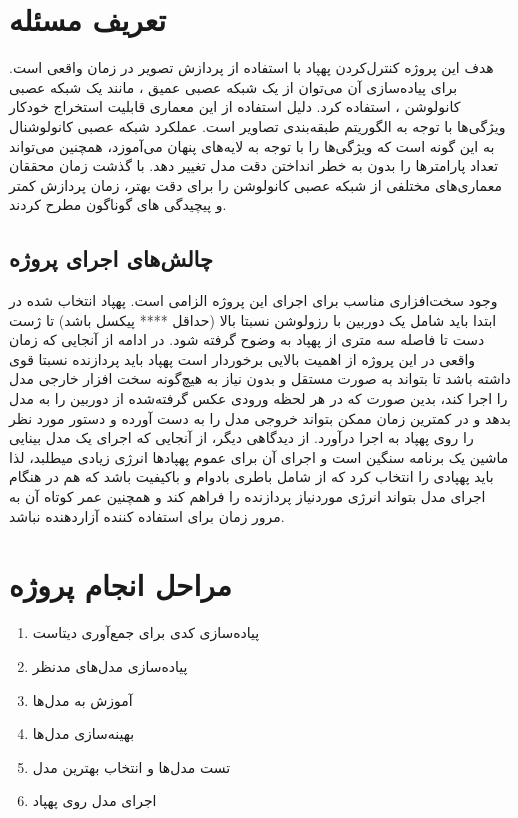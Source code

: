 \section{تعریف مسئله}
هدف این پروژه کنترل‌کردن پهپاد با استفاده از پردازش تصویر در زمان واقعی است. برای پیاده‌سازی آن می‌توان از یک شبکه عصبی عمیق 
، مانند یک شبکه عصبی کانولوشن  ، استفاده کرد. دلیل استفاده از این معماری قابلیت استخراج خودکار ویژگی‌ها با توجه به الگوریتم طبقه‌بندی تصاویر
است. عملکرد شبکه عصبی کانولوشنال به این گونه است که ویژگی‌ها را با توجه به لایه‌های پنهان می‌آموزد، همچنین می‌تواند تعداد پارامترها را بدون به خطر انداختن دقت مدل تغییر دهد. با گذشت زمان محققان 
معماری‌های مختلفی از شبکه عصبی کانولوشن را برای دقت بهتر، زمان پردازش کمتر و پیچیدگی های  گوناگون مطرح کردند. 

\subsection{چالش‌های اجرای پروژه}
وجود سخت‌افزاری مناسب برای اجرای این پروژه الزامی است. پهپاد انتخاب شده در ابتدا باید شامل یک دوربین با رزولوشن نسبتا بالا (حداقل **** پیکسل باشد) تا  ژست دست تا فاصله سه متری از پهپاد به وضوح گرفته شود.
در ادامه از آنجایی که زمان واقعی در این پروژه از اهمیت بالایی برخوردار است پهپاد باید پردازنده نسبتا قوی داشته باشد تا بتواند به صورت مستقل و بدون نیاز به هیچ‌گونه سخت افزار خارجی مدل را اجرا کند، 
بدین صورت که در هر لحظه ورودی عکس گرفته‌شده از دوربین را به مدل بدهد و در کمترین زمان ممکن بتواند خروجی مدل را به دست آورده و دستور مورد نظر را روی 
پهپاد به اجرا درآورد. از دیدگاهی دیگر، از آنجایی که اجرای یک مدل بینایی ماشین یک برنامه سنگین است و اجرای آن برای عموم پهپاد‌ها انرژی زیادی میطلبد، لذا باید پهپادی را انتخاب کرد
که از شامل باطری بادوام و باکیفیت باشد که هم در هنگام اجرای مدل بتواند انرژی مورد‌نیاز پردازنده را فراهم کند و همچنین عمر کوتاه آن به مرور زمان برای استفاده کننده آزاردهنده نباشد.



\section{مراحل انجام پروژه}
\begin{enumerate}
    \item  {پیاده‌سازی کدی برای جمع‌آوری دیتاست}
    \item  {پیاده‌سازی مدل‌های مدنظر}
    \item  {آموزش به مدل‌ها}
    \item  {بهینه‌سازی مدل‌ها}
    \item  {تست مدل‌ها و انتخاب بهترین مدل}
    \item  {اجرای مدل روی پهپاد}
\end{enumerate}
 

